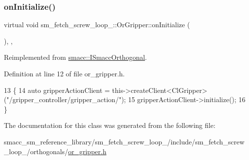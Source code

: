 \subsubsection{\texorpdfstring{on\+Initialize()}{onInitialize()}}
{\footnotesize\ttfamily virtual void sm\+\_\+fetch\+\_\+screw\+\_\+loop\+\_\+::\+Or\+Gripper\+::on\+Initialize (\begin{DoxyParamCaption}{ }\end{DoxyParamCaption})\hspace{0.3cm}{\ttfamily [inline]}, {\ttfamily [override]}, {\ttfamily [virtual]}}



Reimplemented from \hyperlink{classsmacc_1_1ISmaccOrthogonal_a6bb31c620cb64dd7b8417f8705c79c7a}{smacc\+::\+I\+Smacc\+Orthogonal}.



Definition at line 12 of file or\+\_\+gripper.\+h.


\begin{DoxyCode}
13     \{
14         \textcolor{keyword}{auto} gripperActionClient = this->createClient<ClGripper>(\textcolor{stringliteral}{"/gripper\_controller/gripper\_action/"});
15         gripperActionClient->initialize();
16     \}
\end{DoxyCode}


The documentation for this class was generated from the following file\+:\begin{DoxyCompactItemize}
\item 
smacc\+\_\+sm\+\_\+reference\+\_\+library/sm\+\_\+fetch\+\_\+screw\+\_\+loop\+\_/include/sm\+\_\+fetch\+\_\+screw\+\_\+loop\+\_/orthogonals/\hyperlink{sm__fetch__screw__loop__1_2include_2sm__fetch__screw__loop__1_2orthogonals_2or__gripper_8h}{or\+\_\+gripper.\+h}\end{DoxyCompactItemize}
